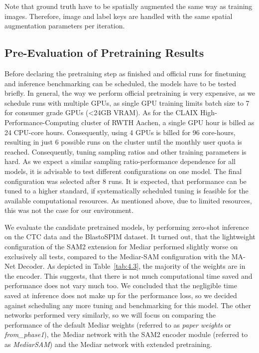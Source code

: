 Note that ground truth have to be spatially augmented the same way as training images. Therefore, image and label keys are handled with the same spatial augmentation parameters per iteration. 

\subsection{Pre-Evaluation of Pretraining Results}

Before declaring the pretraining step as finished and official runs for finetuning and inference benchmarking can be scheduled, the models have to be tested briefly. In general, the way we perform official pretraining is very expensive, as we schedule runs with multiple GPUs, as single GPU training limits batch size to 7 for consumer grade GPUs (\textless24GB VRAM). As for the CLAIX High-Performance-Computing cluster of RWTH Aachen, a single GPU hour is billed as 24 CPU-core hours. Consequently, using 4 GPUs is billed for 96 core-hours, resulting in just 6 possible runs on the cluster until the monthly user quota is reached. Consequently, tuning sampling ratios and other training parameters is hard. As we expect a similar sampling ratio-performance dependence for all models, it is advisable to test different configurations on one model. The final configuration was selected after 8 runs. It is expected, that performance can be tuned to a higher standard, if systematically scheduled tuning is feasible for the available computational resources. As mentioned above, due to limited resources, this was not the case for our environment. 

We evaluate the candidate pretrained models, by performing zero-shot inference on the CTC data and the BlastoSPIM dataset. It turned out, that the lightweight configuration of the SAM2 extension for Mediar performed slightly worse on exclusively all tests, compared to the Mediar-SAM configuration with the MA-Net Decoder. As depicted in Table~\ref{tab:4.3}, the majority of the weights are in the encoder. This suggests, that there is not much computational time saved and performance does not vary much too. We concluded that the negligible time saved at inference does not make up for the performance loss, so we decided against scheduling any more tuning and benchmarking for this model. The other networks performed very similarly, so we will focus on comparing the performance of the default Mediar weights (referred to as \textit{paper weights} or \textit{from\_phase1}), the Mediar network with the SAM2 encoder module (referred to as \textit{MediarSAM}) and the Mediar network with extended pretraining.   

